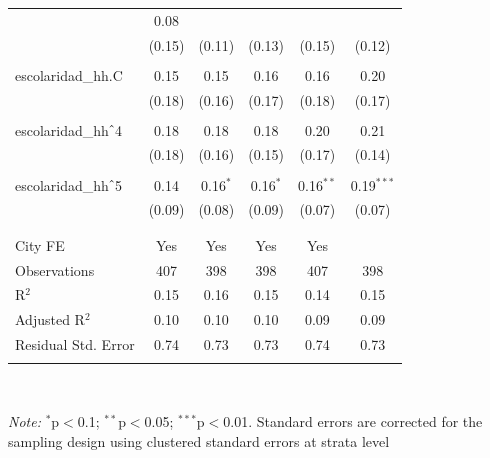 \begin{table}[H]
\begin{tabularx}{0.9\textwidth}{@{\extracolsep{-7pt}}lccccc}
& 0.08 \\    & (0.15) & (0.11) & (0.13) & (0.15) & (0.12) \\    & & & & & \\   escolaridad\_hh.C & 0.15 & 0.15 & 0.16 & 0.16 & 0.20 \\    & (0.18) & (0.16) & (0.17) & (0.18) & (0.17) \\    & & & & & \\   escolaridad\_hh$\hat{\mkern6mu}$4 & 0.18 & 0.18 & 0.18 & 0.20 & 0.21 \\    & (0.18) & (0.16) & (0.15) & (0.17) & (0.14) \\    & & & & & \\   escolaridad\_hh$\hat{\mkern6mu}$5 & 0.14 & 0.16$^{*}$ & 0.16$^{*}$ & 0.16$^{**}$ & 0.19$^{***}$ \\    & (0.09) & (0.08) & (0.09) & (0.07) & (0.07) \\    & & & & & \\  \hline \\[-1.8ex]  City FE & Yes & Yes & Yes & Yes &  \\  Observations & 407 & 398 & 398 & 407 & 398 \\  R$^{2}$ & 0.15 & 0.16 & 0.15 & 0.14 & 0.15 \\  Adjusted R$^{2}$ & 0.10 & 0.10 & 0.10 & 0.09 & 0.09 \\  Residual Std. Error & 0.74 & 0.73 & 0.73 & 0.74 & 0.73 \\  \hline  \hline \\[-1.8ex]  \end{tabularx} \\ \parbox[]{\textwidth}{\textit{Note:} $^{*}$p$<$0.1; $^{**}$p$<$0.05; $^{***}$p$<$0.01. Standard errors are corrected for the sampling design using clustered standard errors at strata level }  \end{table} 